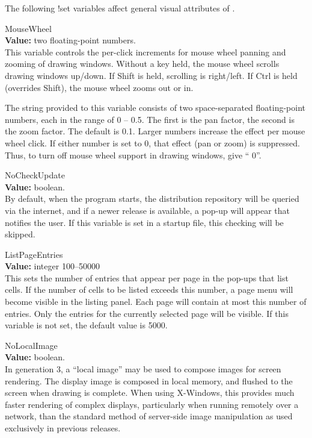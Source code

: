 The following {\cb !set} variables affect general visual attributes of
{\Xic}.

\begin{description}
\item{\et MouseWheel}\\
{\bf Value:} two floating-point numbers.\\
This variable controls the per-click increments for mouse wheel
panning and zooming of drawing windows.  Without a key held, the
mouse wheel scrolls drawing windows up/down.  If {\kb Shift} is held,
scrolling is right/left.  If {\kb Ctrl} is held (overrides {\kb
Shift}), the mouse wheel zooms out or in.

The string provided to this variable consists of two space-separated
floating-point numbers, each in the range of 0 -- 0.5.  The first is
the pan factor, the second is the zoom factor.  The default is { 0.1}.  Larger numbers increase the effect per mouse wheel click. 
If either number is set to 0, that effect (pan or zoom) is
suppressed.  Thus, to turn off mouse wheel support in drawing windows,
give ``{ 0}''.

\item{\et NoCheckUpdate}\\
{\bf Value:} boolean.\\
By default, when the program starts, the distribution repository will
be queried via the internet, and if a newer release is available, a
pop-up will appear that notifies the user.  If this variable is set in
a startup file, this checking will be skipped.

\item{\et ListPageEntries}\\
{\bf Value:} integer 100--50000\\
This sets the number of entries that appear per page in the pop-ups
that list cells.  If the number of cells to be listed exceeds this
number, a page menu will become visible in the listing panel.  Each
page will contain at most this number of entries.  Only the entries
for the currently selected page will be visible.  If this variable is
not set, the default value is 5000.

\item{\et NoLocalImage}\\
{\bf Value:} boolean.\\
In {\Xic} generation 3, a ``local image'' may be used to compose
images for screen rendering.  The display image is composed in local
memory, and flushed to the screen when drawing is complete.  When
using X-Windows, this provides much faster rendering of complex
displays, particularly when running remotely over a network, than the
standard method of server-side image manipulation as used exclusively
in previous {\Xic} releases.


\end{description}
